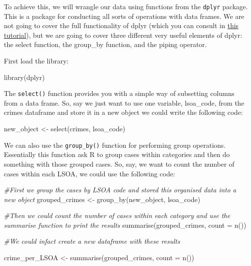 \documentclass[
]{book}
\newenvironment{Shaded}{\begin{snugshade}}{\end{snugshade}}
\newcommand{\AttributeTok}[1]{\textcolor[rgb]{0.77,0.63,0.00}{#1}}
\newcommand{\CommentTok}[1]{\textcolor[rgb]{0.56,0.35,0.01}{\textit{#1}}}
\newcommand{\FunctionTok}[1]{\textcolor[rgb]{0.00,0.00,0.00}{#1}}
\newcommand{\NormalTok}[1]{#1}
\newcommand{\OtherTok}[1]{\textcolor[rgb]{0.56,0.35,0.01}{#1}}
\begin{document}
To achieve this, we will wrangle our data using functions from the \texttt{dplyr} package. This is a package for conducting all sorts of operations with data frames. We are not going to cover the full functionality of dplyr (which you can consult in \href{https://cran.r-project.org/web/packages/dplyr/vignettes/dplyr.html}{this tutorial}), but we are going to cover three different very useful elements of dplyr: the select function, the group\_by function, and the piping operator.

First load the library:

\begin{Shaded}
\begin{Highlighting}[]
\FunctionTok{library}\NormalTok{(dplyr)}
\end{Highlighting}
\end{Shaded}

The \texttt{select()} function provides you with a simple way of subsetting columns from a data frame. So, say we just want to use one variable, lsoa\_code, from the crimes dataframe and store it in a new object we could write the following code:

\begin{Shaded}
\begin{Highlighting}[]
\NormalTok{new\_object }\OtherTok{\textless{}{-}} \FunctionTok{select}\NormalTok{(crimes, lsoa\_code)}
\end{Highlighting}
\end{Shaded}

We can also use the \texttt{group\_by()} function for performing group operations. Essentially this function ask R to group cases within categories and then do something with those grouped cases. So, say, we want to count the number of cases within each LSOA, we could use the following code:

\begin{Shaded}
\begin{Highlighting}[]
\CommentTok{\#First we group the cases by LSOA code and stored this organised data into a new object}
\NormalTok{grouped\_crimes }\OtherTok{\textless{}{-}} \FunctionTok{group\_by}\NormalTok{(new\_object, lsoa\_code)}

\CommentTok{\#Then we could count the number of cases within each category and use the summarise function to print the results}
\FunctionTok{summarise}\NormalTok{(grouped\_crimes, }\AttributeTok{count =} \FunctionTok{n}\NormalTok{())}

\CommentTok{\#We could infact create a new dataframe with these results}

\NormalTok{crime\_per\_LSOA }\OtherTok{\textless{}{-}} \FunctionTok{summarise}\NormalTok{(grouped\_crimes, }\AttributeTok{count =} \FunctionTok{n}\NormalTok{())}
\end{Highlighting}
\end{Shaded}
\end{document}
